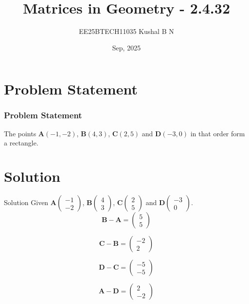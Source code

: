 \documentclass{beamer}
\title{Matrices in Geometry - 2.4.32}
\author{EE25BTECH11035  Kushal B N}
\date{Sep, 2025}
\let\vec\mathbf
\providecommand{\brak}[1]{\ensuremath{\left(#1\right)}}
\theoremstyle{remark}
\newcommand{\myvec}[1]{\ensuremath{\begin{pmatrix}#1\end{pmatrix}}}
\begin{document}
\maketitle


\begin{frame}
\tableofcontents
\end{frame}

\section{Problem Statement}
\begin{frame}
\frametitle{Problem Statement}
The points $\vec{A}\brak{-1,-2}$, $\vec{B}\brak{4,3}$, $\vec{C}\brak{2,5}$ and $\vec{D}\brak{-3,0}$ in that order form a rectangle.
\end{frame}

\section{Solution}
\begin{frame}{Solution}
   Given $\vec{A}\myvec{-1\\-2}$, $\vec{B}\myvec{4\\3}$, $\vec{C}\myvec{2\\5}$ and $\vec{D}\myvec{-3\\0}$. \\
   
 \begin{equation}
\vec{B} - \vec{A} = \myvec{5\\5}
\end{equation}

\begin{equation}
\vec{C} - \vec{B} = \myvec{-2\\2}
\end{equation}

\begin{equation}
\vec{D} - \vec{C} = \myvec{-5\\-5}
\end{equation}

\begin{equation}
\vec{A} - \vec{D} = \myvec{2\\-2}
\end{equation}
    
\end{frame}
\end{document}
